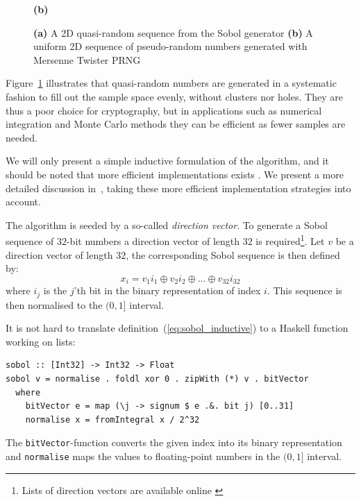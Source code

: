 \documentclass[preprint]{sigplanconf}
\begin{document}
\begin{figure}
\begin{minipage}{0.45\linewidth}
\begin{center}
      \hspace{0.55cm}\textbf{(b)}
    \end{center}
  \end{minipage}

  \caption{\textbf{(a)} A 2D quasi-random sequence from the Sobol
    generator \textbf{(b)} A uniform 2D sequence of pseudo-random
    numbers generated with Mersenne Twister PRNG}
\label{fig:discrepancyplot}
\end{figure}
Figure~\ref{fig:discrepancyplot} illustrates that quasi-random numbers
are generated in a systematic fashion to fill out the sample space
evenly, without clusters nor holes. They are thus a poor choice for
cryptography, but in applications such as numerical integration and
Monte Carlo methods they can be efficient as fewer samples are needed.

We will only present a simple inductive formulation of the algorithm,
and it should be noted that more efficient implementations exists
\cite{bratley1988algorithm, hwy2011emerald}. We present a more
detailed discussion in~\cite{dybdalcarlsen2013thesis}, taking these
more efficient implementation strategies into account.

The algorithm is seeded by a so-called \emph{direction vector}. To
generate a Sobol sequence of $32$-bit numbers a direction vector of
length $32$ is required\footnote{Lists of direction vectors are
  available online \cite{homepage:sobol:directionvectors}}. Let $v$ be
a direction vector of length $32$, the corresponding Sobol sequence is
then defined by:
\begin{equation}
x_i = v_1i_1 \oplus v_2i_2 \oplus \ldots \oplus v_{32}i_{32}\label{eq:sobol_inductive}
\end{equation}
where $i_j$ is the $j$'th bit in the binary representation of index
$i$. This sequence is then normalised to the $(0,1]$ interval.

It is not hard to translate definition~(\ref{eq:sobol_inductive}) to a
Haskell function working on lists:
\begin{verbatim}
sobol :: [Int32] -> Int32 -> Float
sobol v = normalise . foldl xor 0 . zipWith (*) v . bitVector
  where
    bitVector e = map (\j -> signum $ e .&. bit j) [0..31]
    normalise x = fromIntegral x / 2^32
\end{verbatim}
The \verb|bitVector|-function converts the given index into its binary
representation and \verb|normalise| maps the values to floating-point
numbers in the $(0,1]$ interval.
\end{document}
